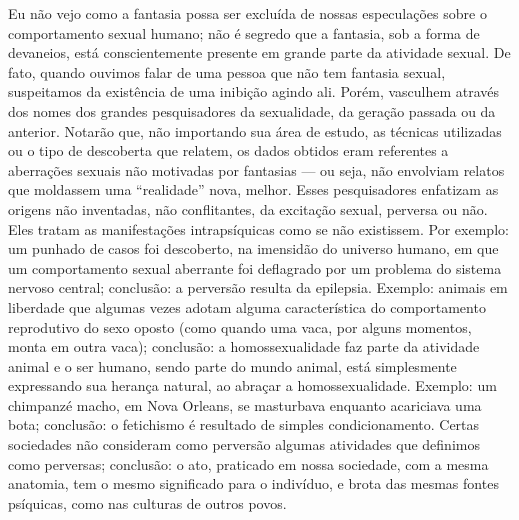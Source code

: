 Eu não vejo como a fantasia possa ser excluída de nossas
especulações sobre o comportamento sexual humano; não é segredo que a
fantasia, sob a forma de devaneios, está conscientemente presente em
grande parte da atividade sexual. De fato, quando ouvimos falar de uma
pessoa que não tem fantasia sexual, suspeitamos da existência de uma
inibição agindo ali. Porém, vasculhem através dos nomes dos grandes
pesquisadores da sexualidade, da geração passada ou da anterior.
Notarão que, não importando sua área de estudo, as técnicas utilizadas
ou o tipo de descoberta que relatem, os dados obtidos eram referentes a
aberrações sexuais não motivadas por fantasias --- ou seja, não envolviam
relatos que moldassem uma ``realidade'' nova,
melhor. Esses pesquisadores enfatizam as origens não inventadas, não
conflitantes,  da excitação sexual, perversa ou não.
Eles tratam as manifestações intrapsíquicas como se não existissem. Por
exemplo: um punhado de casos foi descoberto, na imensidão do universo
humano, em que um comportamento sexual aberrante foi deflagrado por um
problema do sistema nervoso central; conclusão: a perversão resulta da
epilepsia. Exemplo: animais em liberdade que algumas vezes adotam
alguma característica do comportamento reprodutivo do sexo oposto (como
quando uma vaca, por alguns momentos, monta em outra vaca); conclusão:
a homossexualidade faz parte da atividade animal e o ser humano, sendo
parte do mundo animal, está simplesmente expressando sua herança
natural, ao abraçar a homossexualidade. Exemplo: um chimpanzé macho,\idxanim{} em
Nova Orleans, se masturbava enquanto acariciava uma bota; conclusão: o
fetichismo é resultado de simples condicionamento.\idxcond{} Certas sociedades
não consideram como perversão algumas atividades que definimos como
perversas; conclusão: o ato, praticado em nossa sociedade, com a mesma
anatomia, tem o mesmo significado para o indivíduo, e brota das mesmas
fontes psíquicas, como nas culturas\idxrela{} de outros povos.

